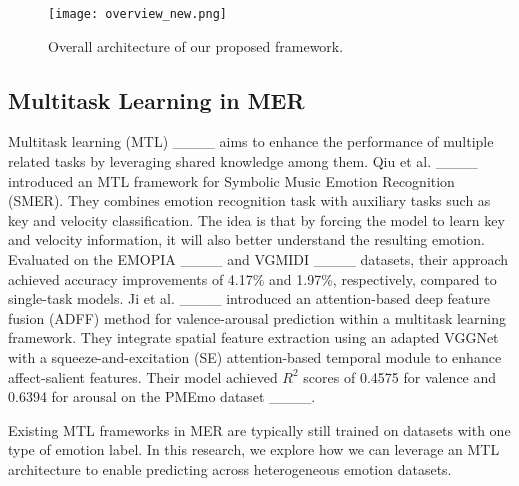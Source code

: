 \begin{figure*}[!ht]
\centering
\texttt{[image: overview\_new.png]}
\caption{Overall architecture of our proposed framework.}
\label{fig:framework}
\end{figure*}

\subsection{Multitask Learning in MER}
Multitask learning (MTL) ____ aims to enhance the performance of multiple related tasks by leveraging shared knowledge among them. Qiu et al. ____ introduced an MTL framework for Symbolic Music Emotion Recognition (SMER). They combines emotion recognition task with auxiliary tasks such as key and velocity classification. The idea is that by forcing the model to learn key and velocity information, it will also better understand the resulting emotion. Evaluated on the EMOPIA ____ and VGMIDI ____ datasets, their approach achieved accuracy improvements of 4.17\% and 1.97\%, respectively, compared to single-task models. Ji et al. ____ introduced an attention-based deep feature fusion (ADFF) method for valence-arousal prediction within a multitask learning framework. They integrate spatial feature extraction using an adapted VGGNet with a squeeze-and-excitation (SE) attention-based temporal module to enhance affect-salient features. Their model achieved \(R^2\) scores of 0.4575 for valence and 0.6394 for arousal on the PMEmo dataset ____.

Existing MTL frameworks in MER are typically still trained on datasets with one type of emotion label. In this research, we explore how we can leverage an MTL architecture to enable predicting across heterogeneous emotion datasets.

